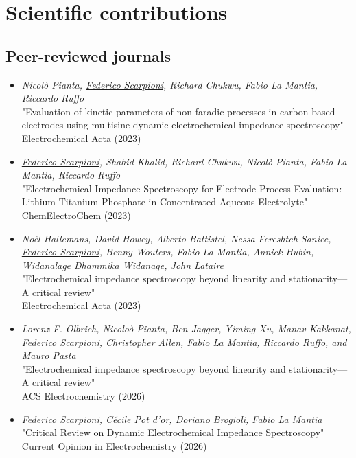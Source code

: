 \chapter*{Scientific contributions}

\section*{Peer-reviewed journals}

\begin{itemize}
\item \textit{Nicolò Pianta, \underline{Federico Scarpioni}, Richard Chukwu, Fabio La Mantia, Riccardo Ruffo}\\
{\large "Evaluation of kinetic parameters of non-faradic processes in carbon-based electrodes using multisine dynamic electrochemical impedance spectroscopy"}\\
Electrochemical Acta (2023)


\item \textit{\underline{Federico Scarpioni}, Shahid Khalid, Richard Chukwu, Nicolò Pianta, Fabio La Mantia, Riccardo Ruffo}\\
{\large"Electrochemical Impedance Spectroscopy for Electrode Process Evaluation: Lithium Titanium Phosphate in Concentrated Aqueous Electrolyte"}\\
ChemElectroChem (2023)


\item \textit{Noël Hallemans, David Howey, Alberto Battistel, Nessa Fereshteh Saniee, \underline{Federico Scarpioni}, Benny Wouters, Fabio La Mantia, Annick Hubin, Widanalage Dhammika Widanage, John Lataire}\\
{\large"Electrochemical impedance spectroscopy beyond linearity and stationarity—A critical review"}\\
Electrochemical Acta (2023)


\item \textit{Lorenz F. Olbrich, Nicoloò Pianta, Ben Jagger, Yiming Xu, Manav Kakkanat, \underline{Federico Scarpioni}, Christopher Allen, Fabio La Mantia, Riccardo Ruffo, and Mauro Pasta}\\
{\large"Electrochemical impedance spectroscopy beyond linearity and stationarity—A critical review"}\\
ACS Electrochemistry (2026)

\item \textit{\underline{Federico Scarpioni}, Cécile Pot d'or, Doriano Brogioli, Fabio La Mantia}\\
{\large"Critical Review on Dynamic Electrochemical Impedance Spectroscopy"}\\
Current Opinion in Electrochemistry (2026)

\end{itemize}


